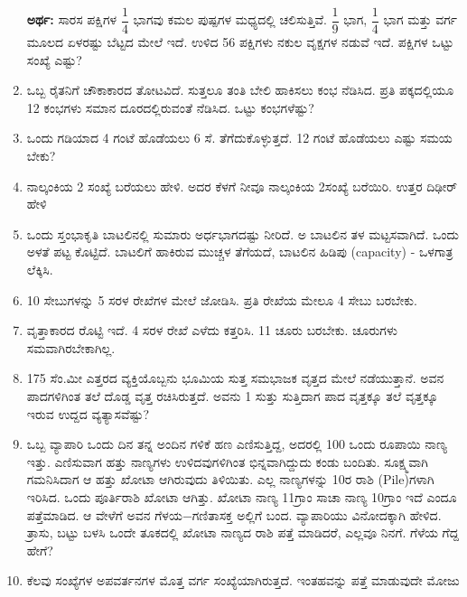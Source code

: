 \begin{enumerate}
\smallskip
{\bf ಅರ್ಥ:} ಸಾರಸ ಪಕ್ಷಿಗಳ $\dfrac{1}{4}$ ಭಾಗವು ಕಮಲ ಪುಷ್ಪಗಳ ಮಧ್ಯದಲ್ಲಿ ಚಲಿಸುತ್ತಿವೆ. $\dfrac{1}{9}$ ಭಾಗ, $\dfrac{1}{4}$ ಭಾಗ ಮತ್ತು ವರ್ಗ ಮೂಲದ ಏಳರಷ್ಟು ಬೆಟ್ಟದ ಮೇಲೆ ಇದೆ. ಉಳಿದ 56 ಪಕ್ಷಿಗಳು ನಕುಲ ವೃಕ್ಷಗಳ ನಡುವೆ ಇದೆ. ಪಕ್ಷಿಗಳ ಒಟ್ಟು ಸಂಖ್ಯೆ ಎಷ್ಟು? 

\smallskip
\item ಒಬ್ಬ ರೈತನಿಗೆ ಚೌಕಾಕಾರದ ತೋಟವಿದೆ. ಸುತ್ತಲೂ ತಂತಿ ಬೇಲಿ ಹಾಕಿಸಲು ಕಂಭ ನೆಡಿಸಿದ. ಪ್ರತಿ ಪಕ್ಕದಲ್ಲಿಯೂ 12 ಕಂಭಗಳು ಸಮಾನ ದೂರದಲ್ಲಿರುವಂತೆ ನೆಡಿಸಿದ. ಒಟ್ಟು ಕಂಭಗಳೆಷ್ಟು?

\item ಒಂದು ಗಡಿಯಾದ 4 ಗಂಟೆ ಹೊಡೆಯಲು 6 ಸೆ. ತೆಗೆದುಕೊಳ್ಳುತ್ತದೆ. 12 ಗಂಟೆ ಹೊಡೆಯಲು ಎಷ್ಟು ಸಮಯ ಬೇಕು? 

\item ನಾಲ್ಕಂಕಿಯ 2 ಸಂಖ್ಯೆ ಬರೆಯಲು ಹೇಳಿ. ಅದರ ಕೆಳಗೆ ನೀವೂ ನಾಲ್ಕಂಕಿಯ 2\break ಸಂಖ್ಯೆ  ಬರೆಯಿರಿ. ಉತ್ತರ ದಿಢೀರ್ ಹೇಳಿ

\item ಒಂದು ಸ್ತಂಭಾಕೃತಿ ಬಾಟಲಿನಲ್ಲಿ ಸುಮಾರು ಅರ್ಧಭಾಗದಷ್ಟು ನೀರಿದೆ. ಅ ಬಾಟಲಿನ ತಳ ಮಟ್ಟಸವಾಗಿದೆ. ಒಂದು ಅಳತೆ ಪಟ್ಟ ಕೊಟ್ಟಿದೆ. ಬಾಟಲಿಗೆ ಹಾಕಿರುವ ಮುಚ್ಚಳ ತೆಗೆಯದೆ, ಬಾಟಲಿನ ಹಿಡಿಪು (capacity) - ಒಳಗಾತ್ರ ಲೆಕ್ಕಿಸಿ. 

\item 10 ಸೇಬುಗಳನ್ನು 5 ಸರಳ ರೇಖೆಗಳ ಮೇಲೆ ಜೋಡಿಸಿ. ಪ್ರತಿ ರೇಖೆಯ ಮೇಲೂ 4 ಸೇಬು ಬರಬೇಕು. 

\item ವೃತ್ತಾಕಾರದ ರೊಟ್ಟಿ ಇದೆ. 4 ಸರಳ ರೇಖೆ ಎಳೆದು ಕತ್ತರಿಸಿ. 11 ಚೂರು ಬರಬೇಕು. ಚೂರುಗಳು ಸಮವಾಗಿರಬೇಕಾಗಿಲ್ಲ. 

\item 175 ಸೆಂ.ಮೀ ಎತ್ತರದ ವ್ಯಕ್ತಿಯೊಬ್ಬನು ಭೂಮಿಯ ಸುತ್ತ ಸಮಭಾಜಕ ವೃತ್ತದ ಮೇಲೆ ನಡೆಯುತ್ತಾನೆ. ಅವನ ಪಾದಗಳಿಗಿಂತ ತಲೆ ದೊಡ್ಡ ವೃತ್ತ ರಚಿಸಿರುತ್ತದೆ. ಅವನು 1 ಸುತ್ತು ಸುತ್ತಿದಾಗ ಪಾದ ವೃತ್ತಕ್ಕೂ ತಲೆ ವೃತ್ತಕ್ಕೂ ಇರುವ ಉದ್ದದ ವ್ಯತ್ಯಾಸವೆಷ್ಟು? 

\eject

\item ಒಬ್ಬ ವ್ಯಾಪಾರಿ ಒಂದು ದಿನ ತನ್ನ ಅಂದಿನ ಗಳಿಕೆ ಹಣ ಎಣಿಸುತ್ತಿದ್ದ, ಅದರಲ್ಲಿ 100 ಒಂದು ರೂಪಾಯಿ ನಾಣ್ಯ ಇತ್ತು. ಎಣಿಸುವಾಗ ಹತ್ತು ನಾಣ್ಯಗಳು ಉಳಿದವುಗಳಿಗಿಂತ ಭಿನ್ನವಾಗಿದ್ದುದು ಕಂಡು ಬಂದಿತು. ಸೂಕ್ಷ್ಮವಾಗಿ ಗಮನಿಸಿದಾಗ ಆ ಹತ್ತು ಖೋಟಾ ಆಗಿರುವುದು ತಿಳಿಯಿತು. ಎಲ್ಲ ನಾಣ್ಯಗಳನ್ನು 10ರ ರಾಶಿ (Pile)ಗಳಾಗಿ ಇರಿಸಿದ. ಒಂದು ಪೂರ್ತಿರಾಶಿ ಖೋಟಾ ಆಗಿತ್ತು. ಖೋಟಾ ನಾಣ್ಯ 11ಗ್ರಾಂ ಸಾಚಾ ನಾಣ್ಯ 10ಗ್ರಾಂ ಇದೆ ಎಂದೂ ಪತ್ತೆಮಾಡಿದ. ಆ ವೇಳೆಗೆ ಅವನ ಗೆಳಯ$-$ಗಣಿತಾಸಕ್ತ ಅಲ್ಲಿಗೆ ಬಂದ. ವ್ಯಾಪಾರಿಯು ವಿನೋದಕ್ಕಾಗಿ ಹೇಳಿದ. ತ್ರಾಸು, ಬಟ್ಟು ಬಳಸಿ ಒಂದೇ ತೂಕದಲ್ಲಿ ಖೋಟಾ ನಾಣ್ಯದ ರಾಶಿ ಪತ್ತೆ ಮಾಡಿದರೆ, ಎಲ್ಲವೂ ನಿನಗೆ. ಗೆಳೆಯ ಗೆದ್ದ ಹೇಗೆ?

\item ಕೆಲವು ಸಂಖ್ಯೆಗಳ ಅಪವರ್ತನಗಳ ಮೊತ್ತ ವರ್ಗ ಸಂಖ್ಯೆಯಾಗಿರುತ್ತದೆ. ಇಂತಹವನ್ನು ಪತ್ತೆ ಮಾಡುವುದೇ ಮೋಜು 


\end{enumerate}
